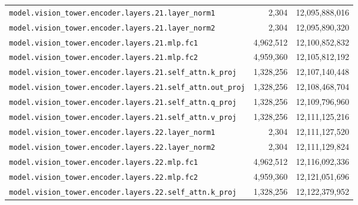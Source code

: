 \documentclass[10pt,a4paper]{article}
\theoremstyle{definition}
\begin{document}
\begin{appendices}
\begin{longtable}{p{9.5cm}rr}
\texttt{model.\allowbreak{}vision\_tower.\allowbreak{}encoder.\allowbreak{}layers.\allowbreak{}21.\allowbreak{}layer\_norm1} & 2,304 & 12,095,888,016 \\
\texttt{model.\allowbreak{}vision\_tower.\allowbreak{}encoder.\allowbreak{}layers.\allowbreak{}21.\allowbreak{}layer\_norm2} & 2,304 & 12,095,890,320 \\
\texttt{model.\allowbreak{}vision\_tower.\allowbreak{}encoder.\allowbreak{}layers.\allowbreak{}21.\allowbreak{}mlp.\allowbreak{}fc1} & 4,962,512 & 12,100,852,832 \\
\texttt{model.\allowbreak{}vision\_tower.\allowbreak{}encoder.\allowbreak{}layers.\allowbreak{}21.\allowbreak{}mlp.\allowbreak{}fc2} & 4,959,360 & 12,105,812,192 \\
\texttt{model.\allowbreak{}vision\_tower.\allowbreak{}encoder.\allowbreak{}layers.\allowbreak{}21.\allowbreak{}self\_attn.\allowbreak{}k\_proj} & 1,328,256 & 12,107,140,448 \\
\texttt{model.\allowbreak{}vision\_tower.\allowbreak{}encoder.\allowbreak{}layers.\allowbreak{}21.\allowbreak{}self\_attn.\allowbreak{}out\_proj} & 1,328,256 & 12,108,468,704 \\
\texttt{model.\allowbreak{}vision\_tower.\allowbreak{}encoder.\allowbreak{}layers.\allowbreak{}21.\allowbreak{}self\_attn.\allowbreak{}q\_proj} & 1,328,256 & 12,109,796,960 \\
\texttt{model.\allowbreak{}vision\_tower.\allowbreak{}encoder.\allowbreak{}layers.\allowbreak{}21.\allowbreak{}self\_attn.\allowbreak{}v\_proj} & 1,328,256 & 12,111,125,216 \\
\texttt{model.\allowbreak{}vision\_tower.\allowbreak{}encoder.\allowbreak{}layers.\allowbreak{}22.\allowbreak{}layer\_norm1} & 2,304 & 12,111,127,520 \\
\texttt{model.\allowbreak{}vision\_tower.\allowbreak{}encoder.\allowbreak{}layers.\allowbreak{}22.\allowbreak{}layer\_norm2} & 2,304 & 12,111,129,824 \\
\texttt{model.\allowbreak{}vision\_tower.\allowbreak{}encoder.\allowbreak{}layers.\allowbreak{}22.\allowbreak{}mlp.\allowbreak{}fc1} & 4,962,512 & 12,116,092,336 \\
\texttt{model.\allowbreak{}vision\_tower.\allowbreak{}encoder.\allowbreak{}layers.\allowbreak{}22.\allowbreak{}mlp.\allowbreak{}fc2} & 4,959,360 & 12,121,051,696 \\
\texttt{model.\allowbreak{}vision\_tower.\allowbreak{}encoder.\allowbreak{}layers.\allowbreak{}22.\allowbreak{}self\_attn.\allowbreak{}k\_proj} & 1,328,256 & 12,122,379,952 \\

\end{longtable}
\end{appendices}
\end{document}

